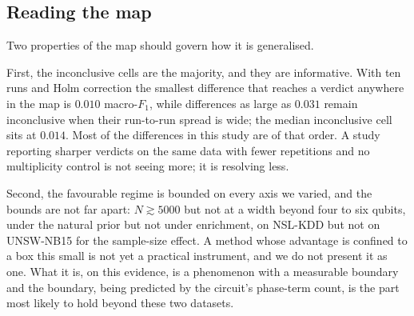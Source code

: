 \subsection{Reading the map}
\begin{revbody}

Two properties of the map should govern how it is generalised.

First, the inconclusive cells are the majority, and they are informative. With
ten runs and Holm correction the smallest difference that reaches a verdict
anywhere in the map is $0.010$ macro-$F_1$, while differences as large as
$0.031$ remain inconclusive when their run-to-run spread is wide; the median
inconclusive cell sits at $0.014$. Most of the differences in this study are of
that order. A study reporting sharper verdicts on the same data with fewer
repetitions and no multiplicity control is not seeing more; it is resolving
less.

Second, the favourable regime is bounded on every axis we varied, and the
bounds are not far apart: $N \gtrsim 5000$ but not at a width beyond four to six
qubits, under the natural prior but not under enrichment, on NSL-KDD but not on
UNSW-NB15 for the sample-size effect. A method whose advantage is confined to a
box this small is not yet a practical instrument, and we do not present it as
one. What it is, on this evidence, is a phenomenon with a measurable boundary
and the boundary, being predicted by the circuit's phase-term count, is the
part most likely to hold beyond these two datasets.
\end{revbody}
